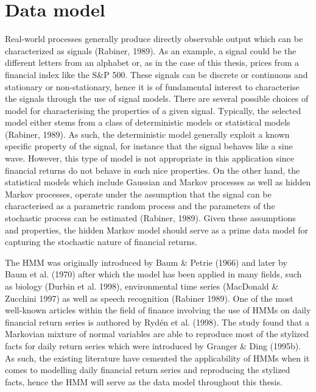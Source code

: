 \newpage
 \section{Data model}
 
Real-world processes generally produce directly observable output which can be characterized as signals (Rabiner, 1989). As an example, a signal could be the different letters from an alphabet or, as in the case of this thesis, prices from a financial index like the S\&P 500. These signals can be discrete or continuous and stationary or non-stationary, hence it is of fundamental interest to characterise the signals through the use of signal models. There are several possible choices of model for characterising the properties of a given signal. Typically, the selected model either stems from a class of deterministic models or statistical models (Rabiner, 1989). As such, the deterministic model generally exploit a known specific property of the signal, for instance that the signal behaves like a sine wave. However, this type of model is not appropriate in this application since financial returns do not behave in such nice properties. On the other hand, the statistical models which include Gaussian and Markov processes as well as hidden Markov processes, operate under the assumption that the signal can be characterised as a parametric random process and the parameters of the stochastic process can be estimated (Rabiner, 1989). Given these assumptions and properties, the hidden Markov model should serve as a prime data model for capturing the stochastic nature of financial returns.

The HMM was originally introduced by Baum \& Petrie (1966) and later by Baum et al. (1970) after which the model has been applied in many fields, such as biology (Durbin et al. 1998), environmental time series (MacDonald \& Zucchini 1997) as well as speech recognition (Rabiner 1989). One of the most well-known articles within the field of finance involving the use of HMMs on daily financial return series is authored by Rydén et al. (1998). The study found that a  Markovian mixture of normal variables are able to reproduce most of the stylized facts for daily return series which were introduced by Granger \& Ding (1995b). As such, the existing literature have cemented the applicability of HMMs when it comes to modelling daily financial return series and reproducing the stylized facts, hence the HMM will serve as the data model throughout this thesis.

